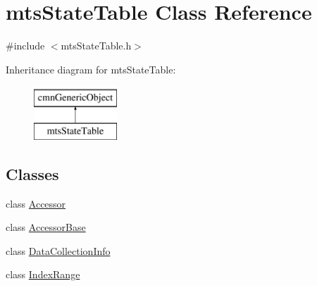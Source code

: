 \hypertarget{classmts_state_table}{}\section{mts\+State\+Table Class Reference}
\label{classmts_state_table}


{\ttfamily \#include $<$mts\+State\+Table.\+h$>$}

Inheritance diagram for mts\+State\+Table\+:\begin{figure}[H]
\begin{center}
\leavevmode
\includegraphics[height=2.000000cm]{d1/d7e/classmts_state_table}
\end{center}
\end{figure}
\subsection*{Classes}
\begin{DoxyCompactItemize}
\item 
class \hyperlink{classmts_state_table_1_1_accessor}{Accessor}
\item 
class \hyperlink{classmts_state_table_1_1_accessor_base}{Accessor\+Base}
\item 
class \hyperlink{classmts_state_table_1_1_data_collection_info}{Data\+Collection\+Info}
\item 
class \hyperlink{classmts_state_table_1_1_index_range}{Index\+Range}
\end{DoxyCompactItemize}
